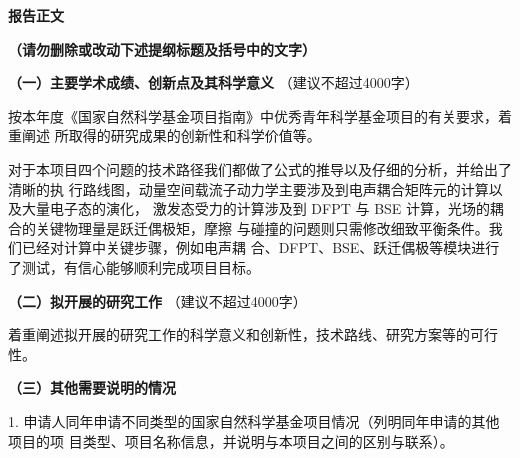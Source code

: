 \documentclass[12pt,UTF8,AutoFakeBold=3,a4paper]{article}
\newcommand{\sanhao}{\fontsize{16pt}{\baselineskip}\selectfont}
\newcommand{\sihao}{\fontsize{14pt}{\baselineskip}\selectfont}
\begin{document}

\begin{center}
 \kaishu{} \bfseries{} \sanhao{} 报告正文
\end{center}

{\kaishu{}\bfseries{}\sihao{}
  \textcolor{NsfcBlue}
  {（请勿删除或改动下述提纲标题及括号中的文字）}
}

{\kaishu{}\sihao{}
  \textcolor{NsfcBlue}
  {\bfseries{}（一）主要学术成绩、创新点及其科学意义}
  \color{NsfcBlue}（建议不超过4000字）
}

{\kaishu{}\sihao{}
  \textcolor{NsfcBlue}{
  按本年度《国家自然科学基金项目指南》中优秀青年科学基金项目的有关要求，着重阐述
  所取得的研究成果的创新性和科学价值等。
}}%

\vspace{6pt}


对于本项目四个问题的技术路径我们都做了公式的推导以及仔细的分析，并给出了清晰的执
行路线图，动量空间载流子动力学主要涉及到电声耦合矩阵元的计算以及大量电子态的演化，
激发态受力的计算涉及到 DFPT 与 BSE 计算，光场的耦合的关键物理量是跃迁偶极矩，摩擦
与碰撞的问题则只需修改细致平衡条件。我们已经对计算中关键步骤，例如电声耦
合、DFPT、BSE、跃迁偶极等模块进行了测试，有信心能够顺利完成项目目标。

{\kaishu{}\sihao{}
  \textcolor{NsfcBlue}
  {\bfseries{}（二）拟开展的研究工作}
  \color{NsfcBlue}（建议不超过4000字）
}

{\kaishu{}\sihao{}
  \color{NsfcBlue}
  着重阐述拟开展的研究工作的科学意义和创新性，技术路线、研究方案等的可行性。
}

{\kaishu{}\sihao{}
  \textcolor{NsfcBlue}
  {\bfseries{}（三）其他需要说明的情况}
}


{\kaishu{}\sihao{} \color{NsfcBlue}
1. 申请人同年申请不同类型的国家自然科学基金项目情况（列明同年申请的其他项目的项
目类型、项目名称信息，并说明与本项目之间的区别与联系）。
}
\end{document}
